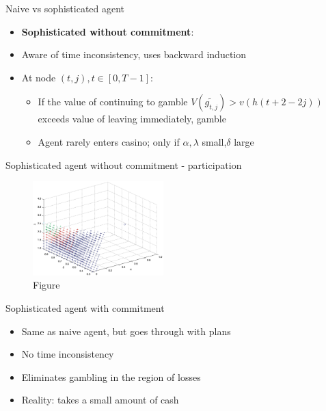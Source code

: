 \begin{frame}{Naive vs sophisticated agent}
    \begin{itemize}
     	\item \textbf{Sophisticated without commitment}:\medskip
        \item Aware of time inconsistency, uses backward induction\medskip
        \item At node $(t, j), t \in [0,T-1]$:\medskip
        \begin{itemize}
        \item If the value of continuing to gamble $V(\tilde{g_{t,j}}) > v(h(t+2-2j))$ exceeds value of leaving immediately, gamble\medskip
        \item Agent rarely enters casino; only if  $\alpha,\lambda $ small,$\delta$ large\medskip
        \end{itemize}
    \end{itemize}
\end{frame}

\begin{frame}{Sophisticated agent without commitment - participation}
\begin{figure}
\centering
    \includegraphics[width = 0.45\textwidth]{cpt_sophisticated}
    \caption{Figure \citet{Barberis2012a}}
    \end{figure}
\end{frame}


\begin{frame}{Sophisticated agent with commitment}
    \begin{itemize}
        \item Same as naive agent, but goes through with plans\medskip
        \item No time inconsistency \medskip
        \item Eliminates gambling in the region of losses\medskip
        \item Reality: takes a small amount of cash\medskip
    \end{itemize}
\end{frame}



